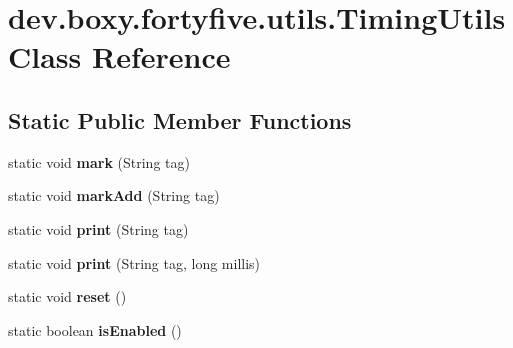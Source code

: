 \hypertarget{classdev_1_1boxy_1_1fortyfive_1_1utils_1_1_timing_utils}{
\section{dev.boxy.fortyfive.utils.TimingUtils Class Reference}
\label{d7/d4a/classdev_1_1boxy_1_1fortyfive_1_1utils_1_1_timing_utils}
}
\subsection*{Static Public Member Functions}
\begin{DoxyCompactItemize}
\item 
\hypertarget{classdev_1_1boxy_1_1fortyfive_1_1utils_1_1_timing_utils_a96be05cb6d8c9b95fe9513dbcc568db2}{
static void {\bfseries mark} (String tag)}
\label{d7/d4a/classdev_1_1boxy_1_1fortyfive_1_1utils_1_1_timing_utils_a96be05cb6d8c9b95fe9513dbcc568db2}

\item 
\hypertarget{classdev_1_1boxy_1_1fortyfive_1_1utils_1_1_timing_utils_a07393b621d92d1a540526093119077a4}{
static void {\bfseries markAdd} (String tag)}
\label{d7/d4a/classdev_1_1boxy_1_1fortyfive_1_1utils_1_1_timing_utils_a07393b621d92d1a540526093119077a4}

\item 
\hypertarget{classdev_1_1boxy_1_1fortyfive_1_1utils_1_1_timing_utils_af3fc493c7dc4bb9951e38dcac55493d0}{
static void {\bfseries print} (String tag)}
\label{d7/d4a/classdev_1_1boxy_1_1fortyfive_1_1utils_1_1_timing_utils_af3fc493c7dc4bb9951e38dcac55493d0}

\item 
\hypertarget{classdev_1_1boxy_1_1fortyfive_1_1utils_1_1_timing_utils_a883169946d748e0146cedf288f8724a2}{
static void {\bfseries print} (String tag, long millis)}
\label{d7/d4a/classdev_1_1boxy_1_1fortyfive_1_1utils_1_1_timing_utils_a883169946d748e0146cedf288f8724a2}

\item 
\hypertarget{classdev_1_1boxy_1_1fortyfive_1_1utils_1_1_timing_utils_ae541c557c7bf1b9104ac2a916a56c414}{
static void {\bfseries reset} ()}
\label{d7/d4a/classdev_1_1boxy_1_1fortyfive_1_1utils_1_1_timing_utils_ae541c557c7bf1b9104ac2a916a56c414}

\item 
\hypertarget{classdev_1_1boxy_1_1fortyfive_1_1utils_1_1_timing_utils_ad17d4da537bf0d0e1dfbf629e234736c}{
static boolean {\bfseries isEnabled} ()}
\label{d7/d4a/classdev_1_1boxy_1_1fortyfive_1_1utils_1_1_timing_utils_ad17d4da537bf0d0e1dfbf629e234736c}

\end{DoxyCompactItemize}
